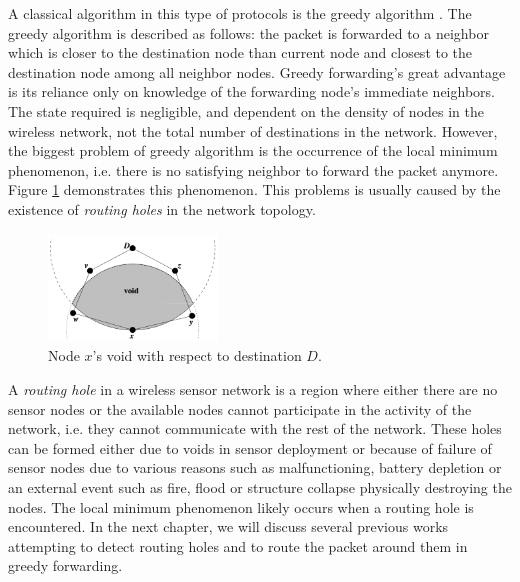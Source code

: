 A classical algorithm in this type of protocols is the greedy algorithm \cite{wsn-greedy}. The greedy algorithm is described as follows: the packet is forwarded to a neighbor which is closer to the destination node than current node and closest to the destination node among all neighbor nodes. Greedy forwarding’s great advantage is its reliance only on knowledge of the forwarding node’s immediate neighbors. The state required is negligible, and dependent on the density of nodes in the wireless network, not the total number of destinations in the network. However, the biggest problem of greedy algorithm is the occurrence of the local minimum phenomenon, i.e. there is no satisfying neighbor to forward the packet anymore. Figure \ref{local-minimum} demonstrates this phenomenon. This problems is usually caused by the existence of \emph{routing holes} in the network topology.
\begin{figure}[!htb]
\centering
\includegraphics[width=0.4\textwidth]{Chapter1/Chapter1Figs/fig-local-minimum.png}
\caption{Node $x$’s void with respect to destination $D$.}
\label{local-minimum}
\end{figure}

A \emph{routing hole} in a wireless sensor network is a region where either there are no sensor nodes or the available nodes cannot participate in the activity of the network, i.e. they cannot communicate with the rest of the network. These holes can be formed either due to voids in sensor deployment or because of failure of sensor nodes due to various reasons such as malfunctioning, battery depletion or an external event such as fire, flood or structure collapse physically destroying the nodes. The local minimum phenomenon likely occurs when a routing hole is encountered. In the next chapter, we will discuss several previous works attempting to detect routing holes and to route the packet around them in greedy forwarding.
